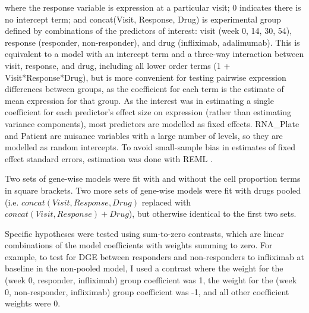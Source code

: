 where the response variable is expression at a particular visit;
0 indicates there is no intercept term;
and concat(Visit, Response, Drug) is experimental group defined by combinations of the predictors of interest:
    visit (week 0, 14, 30, 54), 
    response (responder, non-responder), 
    and drug (infliximab, adalimumab).
This is equivalent to a model with an intercept term and a three-way interaction between visit, response, and drug,
including all lower order terms (1 + Visit*Response*Drug),
but is more convenient for testing pairwise expression differences between groups,
as the coefficient for each term is the estimate of mean expression for that group.
As the interest was in estimating a single coefficient for each predictor's effect size on expression (rather than estimating variance components), 
most predictors are modelled as fixed effects.
RNA\_Plate and Patient are nuisance variables with a large number of levels, so they are modelled as random intercepts.
%
To avoid small-sample bias in estimates of fixed effect standard errors, estimation was done with \gls{REML} \autocite{mcneish2017SmallSampleMethods}.

Two sets of gene-wise models were fit with and without the cell proportion terms in square brackets.
Two more sets of gene-wise models were fit with drugs pooled (i.e. $concat(Visit, Response, Drug)$ replaced with $concat(Visit, Response) + Drug$),
but otherwise identical to the first two sets.

Specific hypotheses were tested using sum-to-zero contrasts, which are linear combinations of the model coefficients with weights summing to zero.
For example, 
to test for \gls{DGE} between responders and non-responders to infliximab at baseline in the non-pooled model,
I used a contrast where
the weight for the (week 0, responder, infliximab) group coefficient was 1,
the weight for the (week 0, non-responder, infliximab) group coefficient was -1,
and all other coefficient weights were 0.


